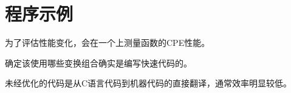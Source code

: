 
\section{程序示例}
{
    为了评估性能变化，会在一个上测量函数的CPE性能。

    确定该使用哪些变换组合确实是编写快速代码的。

    未经优化的代码是从C语言代码到机器代码的直接翻译，通常效率明显较低。
}
